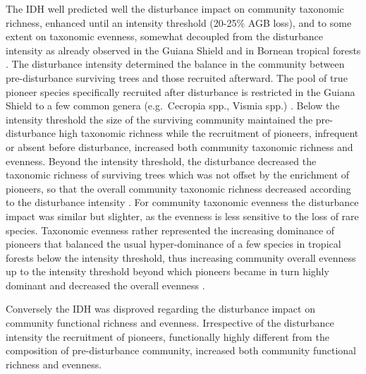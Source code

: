 \documentclass[
  11pt,
  french,
  A4paper,
  extrafontsizes,onecolumn,openright
  ]{memoir}
\begin{document}
The IDH well predicted well the disturbance impact on community
taxonomic richness, enhanced until an intensity threshold (20-25\% AGB
loss), and to some extent on taxonomic evenness, somewhat decoupled from
the disturbance intensity as already observed in the Guiana Shield
\autocite{Baraloto2012} and in Bornean tropical forests
\autocite{Cannon1998}. The disturbance intensity determined the balance
in the community between pre-disturbance surviving trees and those
recruited afterward. The pool of true pioneer species specifically
recruited after disturbance is restricted in the Guiana Shield to a few
common genera (e.g.~Cecropia spp., Vismia spp.) \autocite{Guitet2018}.
Below the intensity threshold the size of the surviving community
maintained the pre-disturbance high taxonomic richness while the
recruitment of pioneers, infrequent or absent before disturbance,
increased both community taxonomic richness and evenness. Beyond the
intensity threshold, the disturbance decreased the taxonomic richness of
surviving trees which was not offset by the enrichment of pioneers, so
that the overall community taxonomic richness decreased according to the
disturbance intensity \autocite{Molino2001}. For community taxonomic
evenness the disturbance impact was similar but slighter, as the
evenness is less sensitive to the loss of rare species. Taxonomic
evenness rather represented the increasing dominance of pioneers that
balanced the usual hyper-dominance of a few species in tropical forests
below the intensity threshold, thus increasing community overall
evenness up to the intensity threshold beyond which pioneers became in
turn highly dominant and decreased the overall evenness
\autocite{Baraloto2012}.

Conversely the IDH was disproved regarding the disturbance impact on
community functional richness and evenness. Irrespective of the
disturbance intensity the recruitment of pioneers, functionally highly
different from the composition of pre-disturbance community, increased
both community functional richness and evenness.
\end{document}
